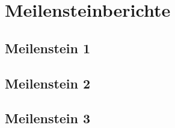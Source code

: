 \section{Meilensteinberichte}
\subsection{Meilenstein 1}


\newpage

\subsection{Meilenstein 2}


\newpage

\subsection{Meilenstein 3}


\newpage